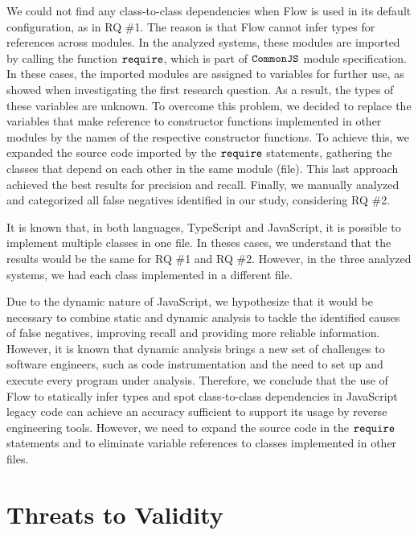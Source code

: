 \documentclass[review]{elsarticle}
\newcommand{\mcode}[1]{$\tt #1$}
\begin{document}
We could not find any class-to-class dependencies when Flow is used in its default configuration, as in RQ \#1. The reason is that Flow cannot infer types for references across modules. In the analyzed systems, these modules are imported by calling the function \mcode{require}, which is part of \mcode{CommonJS} module specification. In these cases, the imported modules are assigned to variables for further use, as showed when investigating the first research question. As a result, the types of these variables are unknown. To overcome this problem, we decided to replace the variables that make reference to constructor functions implemented in other modules by the names of the respective constructor functions. To achieve this, we expanded the source code imported by the \mcode{require} statements, gathering the classes that depend on each other in the same module (file). This last approach achieved the best results for precision and recall. Finally, we manually analyzed and categorized all false negatives identified in our study, considering RQ \#2. 

It is known that, in both languages, TypeScript and JavaScript, it is possible to implement multiple classes in one file. In theses cases, we understand that the results would be the same for RQ \#1 and RQ \#2. However, in the three analyzed systems, we had each class implemented in a different file.

Due to the dynamic nature of JavaScript, we hypothesize that it would be necessary to combine static and dynamic analysis to tackle the identified causes of false negatives, improving recall and providing more reliable information. However, it is known that dynamic analysis brings a new set of challenges to software engineers, such as code instrumentation and the need to set up and execute every program under analysis. Therefore, we conclude that the use of Flow to statically infer types and spot class-to-class dependencies in JavaScript legacy code can achieve an accuracy sufficient to support its usage by reverse engineering tools. However, we need to expand the source code in the \mcode{require} statements and to eliminate variable references to classes implemented in other files.



\section{Threats to Validity}
\label{sec:threats}
\end{document}
